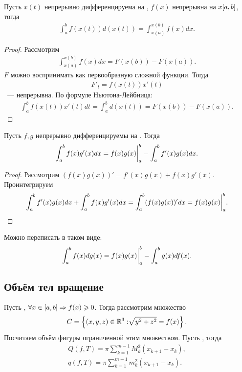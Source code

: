 \documentclass[../main.tex]{subfiles}
\begin{document}
\begin{proposition}
    Пусть $x(t)$ непрерывно дифференцируема на \segab, $f(x)$ непрерывна на $x[a,b]$, тогда 
    \begin{gather} 
      \int_{a}^{b} f(x(t)) d(x(t)) = \int_{x(a)}^{x(b)} f(x)dx.
    \end{gather}
\end{proposition}

\begin{proof}
    Рассмотрим 
    \begin{gather} 
      \int_{x(a)}^{x(b)} f(x)dx = F(x(b)) - F(x(a)).
    \end{gather}
    $F$ можно воспринимать как первообразную сложной функции. Тогда 
    \begin{gather} 
      F'_t = f(x(t)) x'(t)
    \end{gather} 
    ~--- непрерывна. По формуле Ньютона-Лейбница: 
    \begin{gather} 
      \int_{a}^{b} f(x(t)) x'(t) dt = \int_{a}^{b} d(x(t)) = F(x(b)) - F(x(a)).
    \end{gather}
\end{proof}

\begin{proposition}
    Пусть $f, g$ непрерывно дифференцируемы на \segab. Тогда 
    \begin{gather} 
      \int_{a}^{b} f(x) g'(x) dx = f(x)g(x) \bigg|_{a}^{b} - \int_{a}^{b} f'(x) g(x) dx.
    \end{gather}
\end{proposition}

\begin{proof}
    Рассмотрим $(f(x)g(x))' = f'(x)g(x) + f(x)g'(x)$. Проинтегрируем 
    \begin{gather} 
     \int_{a}^{b} f'(x)g(x)dx + \int_{a}^{b} f(x)g'(x)dx= \int_{a}^{b} (f(x)g(x))'dx = f(x)g(x) \bigg|_{a}^{b}.
    \end{gather}  
\end{proof}

\begin{note}
    Можно переписать в таком виде: 
    \begin{gather} 
      \int_{a}^{b} f(x) dg(x) = f(x)g(x) \bigg|_{a}^{b} - \int_{a}^{b} g(x)df(x).
    \end{gather}
\end{note}

\subsection{Объём тел вращение}
Пусть \fabr, $\forall x \in [a,b] \Rightarrow f(x) \geqslant 0$. Тогда рассмотрим множество $$C = \left\{(x,y,z) \in \mathbb{R}^{3}: \sqrt[]{y^{2}+z^{2}} = f(x)\right\}.$$ Посчитаем объём фигуры ограниченной этим множеством. Пусть \tpab, тогда 
\begin{gather} 
  Q(f, T) = \pi \sum_{k=1}^{m-1}M_k^{2} (x_{k+1}-x_{k}), \\
  q(f, T) = \pi \sum_{k=1}^{m-1} m_k^{2} (x_{k+1}-x_{k}).
\end{gather} 
\end{document}
